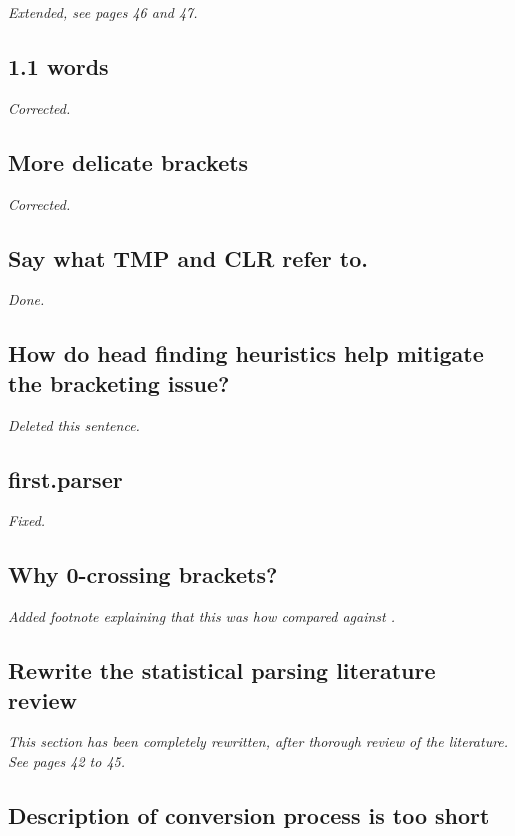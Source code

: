 \emph{Extended, see pages 46 and 47.}

\subsection{1.1 words}

\emph{Corrected.}

\subsection{More delicate brackets}

\emph{Corrected.}

\subsection{Say what TMP and CLR refer to.}

\emph{Done.}

\subsection{How do head finding heuristics help mitigate the bracketing issue?}

\emph{Deleted this sentence.}

\subsection{first.parser}

\emph{Fixed.}

\subsection{Why 0-crossing brackets?}

\emph{Added footnote explaining that this was how \citet{magerman:94} compared against
\citet{black:93}.}

\subsection{Rewrite the statistical parsing literature review}

\emph{This section has been completely rewritten, after thorough review of the
literature. See pages 42 to 45.}

\subsection{Description of \ccgbank conversion process is too short}

